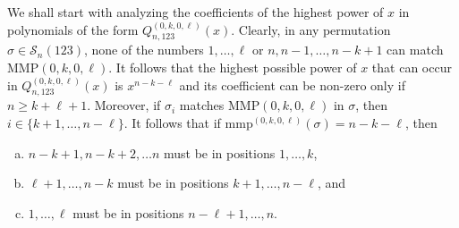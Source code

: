 \documentclass[
final,nomarks
]{dmtcs-episciences}
\newcommand{\Sn}[1]{\mathcal{S}_{#1}}
\newcommand{\Qmn}[2]{Q_{#2,123}^{(#1)}(x)}
\newcommand{\MMP}{\mathrm{MMP}}
\newcommand{\mmp}{\mathrm{mmp}}
\begin{document}
We shall start with analyzing the coefficients of the highest power of \begin{math}x\end{math} in polynomials 
of the form \begin{math}\Qmn{0,k,0,\ell}{n}\end{math}.  Clearly, in any permutation 
\begin{math}\sigma \in \Sn{n}(123)\end{math}, none of the numbers \begin{math}1, \ldots,\ell\end{math} or \begin{math}n,n-1, \ldots, n-k+1\end{math} 
can match \begin{math}\MMP(0,k,0,\ell)\end{math}.  It follows that the highest possible power of 
\begin{math}x\end{math} that can occur in \begin{math}\Qmn{0,k,0,\ell}{n}\end{math} is \begin{math}x^{n-k-\ell}\end{math} and its coefficient 
can be non-zero only if \begin{math}n \geq k+\ell+1\end{math}. Moreover, if \begin{math}\sigma_i\end{math} matches 
\begin{math}\MMP(0,k,0,\ell)\end{math} in \begin{math}\sigma\end{math}, then \begin{math}i \in \{k+1, \ldots, n-\ell\}\end{math}. It follows 
that if \begin{math}\mmp^{(0,k,0,\ell)}(\sigma) = n-k-\ell\end{math}, then 
\begin{enumerate}[(a)]
\item \begin{math}n-k+1,n-k+2, \ldots n\end{math} 
must be in positions \begin{math}1, \ldots, k\end{math}, 
\item \begin{math}\ell+1, \ldots, n-k\end{math} must be in positions 
\begin{math}k+1, \ldots, n-\ell\end{math}, and 
\item \begin{math}1, \ldots, \ell\end{math} must be in positions \begin{math}n-\ell+1, \ldots, n\end{math}. 
\end{enumerate}
\end{document}
